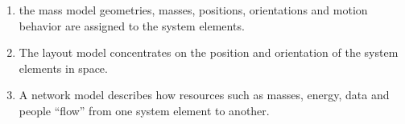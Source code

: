 \begin{enumerate}
\item the mass model geometries, masses, positions, orientations and motion behavior are assigned to the
system elements.

\item The layout model concentrates on the position and orientation of the system elements in space.

\item A network model describes how resources such as masses, energy, data and people “flow” from one system
element to another.



\end{enumerate}